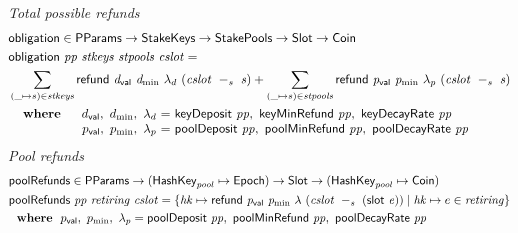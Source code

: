 \begin{figure}[htb]
  \emph{Total possible refunds}
  \begin{align*}
      & \fun{obligation} \in \PParams \to \StakeKeys \to \StakePools \to \Slot \to \Coin \\
      & \obligation{pp}{stkeys}{stpools}{cslot} =\\
      & \sum\limits_{(\_ \mapsto s) \in \var{stkeys}}
        \refund{d_{\mathsf{val}}}{d_{\min}}{\lambda_d}{(\slotminus{cslot}{s})}
        + \sum\limits_{(\_ \mapsto s) \in \var{stpools}}
        \refund{p_{\mathsf{val}}}{p_{\min}}{\lambda_p}{(\slotminus{cslot}{s})} \\
      &
      \begin{array}{lr@{~=~}l}
        \where
          & \dval,~d_{\min},~\lambda_d
          & \fun{keyDeposit}~\var{pp},~\fun{keyMinRefund}~\var{pp},~\fun{keyDecayRate}~\var{pp}
          \\
          & p_{\mathsf{val}},~p_{\min},~\lambda_p
          & \fun{poolDeposit}~\var{pp},~\fun{poolMinRefund}~\var{pp},~\fun{poolDecayRate}~\var{pp}
      \end{array}\\
  \end{align*}
  \emph{Pool refunds}
  \begin{align*}
      & \mathsf{poolRefunds} \in \mathsf{PParams} \to (\mathsf{HashKey}_{pool} \mapsto \mathsf{Epoch}) \to \mathsf{Slot} \to
      (\mathsf{HashKey}_{pool} \mapsto \mathsf{Coin}) \\
      & \mathsf{poolRefunds}~ \mathit{pp}~ \mathit{retiring}~ \mathit{cslot} = \left\{
        \mathit{hk}\mapsto
          \mathsf{refund}~ \mathit{p_{\mathsf{val}}}~ \mathit{p_{\min}}~ {\lambda}~ {(\mathit{cslot}~-_{s}~\mathit{(\mathsf{slot}~e)})}
          \mid
          \mathit{hk}\mapsto e\in\mathit{retiring}
        \right\}\\
      & ~ ~ \mathbf{where}~ ~  p_{\mathsf{val}},~p_{\min},~\lambda_p =
          \mathsf{poolDeposit}~\mathit{pp},~\mathsf{poolMinRefund}~\mathit{pp},~\mathsf{poolDecayRate}~\mathit{pp} \\
  \end{align*}


\end{figure}
